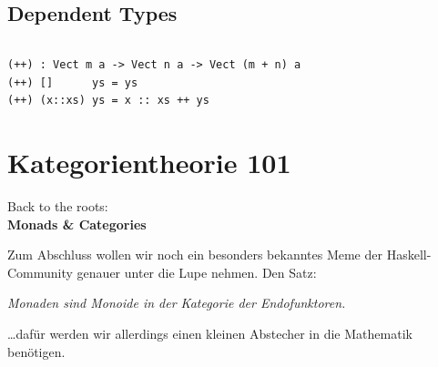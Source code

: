 \documentclass{beamer}
\begin{document}

\subsection*{Dependent Types}

\begin{frame}[fragile]

\begin{verbatim}
\end{verbatim}

\begin{verbatim}
(++) : Vect m a -> Vect n a -> Vect (m + n) a
(++) []      ys = ys
(++) (x::xs) ys = x :: xs ++ ys
\end{verbatim}

\end{frame}

\section*{Kategorientheorie 101}

\begin{frame}

\begin{center}
Back to the roots:\\
\Large \textbf{Monads \& Categories}
\end{center}

\end{frame}


\begin{frame}
Zum Abschluss wollen wir noch ein besonders bekanntes Meme der Haskell-Community genauer
unter die Lupe nehmen. Den Satz:

\begin{center}
\textit{\glqq Monaden sind Monoide in der Kategorie der Endofunktoren.\grqq}
\end{center}
\pause

\dots dafür werden wir allerdings einen kleinen Abstecher in die Mathematik benötigen.
\end{frame}

\end{document}
